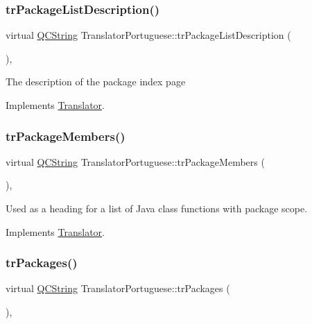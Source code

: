 \subsubsection{\texorpdfstring{trPackageListDescription()}{trPackageListDescription()}}
{\footnotesize\ttfamily virtual \mbox{\hyperlink{class_q_c_string}{Q\+C\+String}} Translator\+Portuguese\+::tr\+Package\+List\+Description (\begin{DoxyParamCaption}{ }\end{DoxyParamCaption})\hspace{0.3cm}{\ttfamily [inline]}, {\ttfamily [virtual]}}

The description of the package index page 

Implements \mbox{\hyperlink{class_translator}{Translator}}.

\mbox{\label{class_translator_portuguese_ae9c591a79f87322df06489b69c2eae7f}} 
\subsubsection{\texorpdfstring{trPackageMembers()}{trPackageMembers()}}
{\footnotesize\ttfamily virtual \mbox{\hyperlink{class_q_c_string}{Q\+C\+String}} Translator\+Portuguese\+::tr\+Package\+Members (\begin{DoxyParamCaption}{ }\end{DoxyParamCaption})\hspace{0.3cm}{\ttfamily [inline]}, {\ttfamily [virtual]}}

Used as a heading for a list of Java class functions with package scope. 

Implements \mbox{\hyperlink{class_translator}{Translator}}.

\mbox{\label{class_translator_portuguese_ab7d7f219b0259b7e3dd317dc997f2b61}} 
\subsubsection{\texorpdfstring{trPackages()}{trPackages()}}
{\footnotesize\ttfamily virtual \mbox{\hyperlink{class_q_c_string}{Q\+C\+String}} Translator\+Portuguese\+::tr\+Packages (\begin{DoxyParamCaption}{ }\end{DoxyParamCaption})\hspace{0.3cm}{\ttfamily [inline]}, {\ttfamily [virtual]}}

